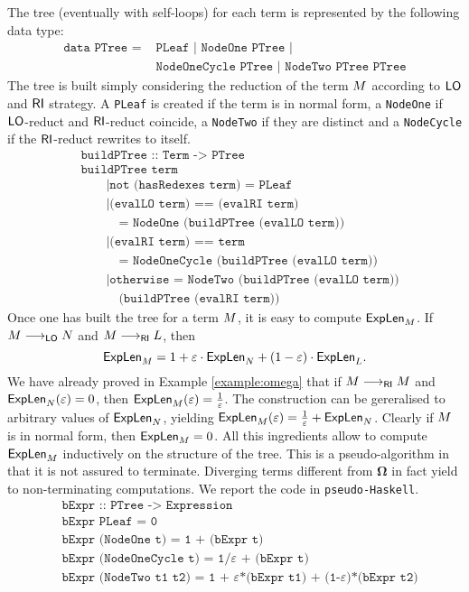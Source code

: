 The tree (eventually with self-loops) for each term is represented by the following data type:
\begin{align*}
	\texttt{data PTree = }&\texttt{PLeaf | NodeOne PTree |}\\
	&\texttt{NodeOneCycle PTree | NodeTwo PTree PTree}
\end{align*}
The tree is built simply considering the reduction of the term $M$ according to $\textsf{LO}$ and $\textsf{RI}$ strategy. A \texttt{PLeaf} is created if the term is in normal form, a \texttt{NodeOne} if $\textsf{LO}$-reduct and $\textsf{RI}$-reduct coincide, a \texttt{NodeTwo} if they are distinct and a \texttt{NodeCycle} if the $\textsf{RI}$-reduct rewrites to itself.
\begin{align*}
&\texttt{buildPTree :: Term -> PTree}\\
&\texttt{buildPTree term}\\
&\qquad\texttt{|not (hasRedexes term) = PLeaf}\\
&\qquad\texttt{|(evalLO term) == (evalRI term)}\\
&\quad\qquad\texttt{= NodeOne (buildPTree (evalLO term))}\\
&\qquad\texttt{|(evalRI term) == term}\\
&\qquad\quad\texttt{= NodeOneCycle (buildPTree (evalLO term))}\\
&\qquad\texttt{|otherwise = NodeTwo (buildPTree (evalLO term))}\\
&\qquad\quad\texttt{(buildPTree (evalRI term))}
\end{align*}
Once one has built the tree for a term $M$, it is easy to compute $\textsf{ExpLen}_{M}$. If $M\longrightarrow_{\textsf{LO}}N$ and $M\longrightarrow_{\textsf{RI}}L$, then
$$
\textsf{ExpLen}_{M}=1+\varepsilon\cdot\textsf{ExpLen}_{N}+(1-\varepsilon)\cdot\textsf{ExpLen}_{L}.
$$
We have already proved in Example \ref{example:omega} that if $M\longrightarrow_{\textsf{RI}}M$ and $\textsf{ExpLen}_{N}(\varepsilon)=0$, then $\textsf{ExpLen}_{M}(\varepsilon)=\frac{1}{\varepsilon}$. The construction can be gereralised to arbitrary values of $\textsf{ExpLen}_{N}$, yielding $\textsf{ExpLen}_{M}(\varepsilon)=\frac{1}{\varepsilon}+\textsf{ExpLen}_{N}$. Clearly if $M$ is in normal form, then $\textsf{ExpLen}_{M}=0$. All this ingredients allow to compute $\textsf{ExpLen}_{M}$ inductively on the structure of the tree. This is a pseudo-algorithm in that it is not assured to terminate. Diverging terms different from $\bm{\Omega}$ in fact yield to non-terminating computations. We report the code in \texttt{pseudo-Haskell}.
\begin{align*}
&\texttt{bExpr :: PTree -> Expression}\\
&\texttt{bExpr PLeaf = 0}\\
&\texttt{bExpr (NodeOne t) = 1 + (bExpr t)}\\
&\texttt{bExpr (NodeOneCycle t) = 1/}\varepsilon\texttt{ + (bExpr t)}\\
&\texttt{bExpr (NodeTwo t1 t2) = 1 + }\varepsilon\texttt{*(bExpr t1) + (1-}\varepsilon\texttt{)*(bExpr t2)}
\end{align*}
